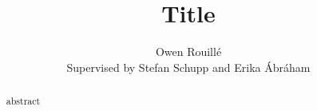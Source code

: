 \documentclass{llncs}
\begin{document}
\title{Title}

\author{Owen Rouill\'e\\ Supervised by Stefan Schupp and Erika \'Abr\'aham}



\maketitle

\begin{abstract}
abstract
\end{abstract}










\printbibliography
\end{document}
